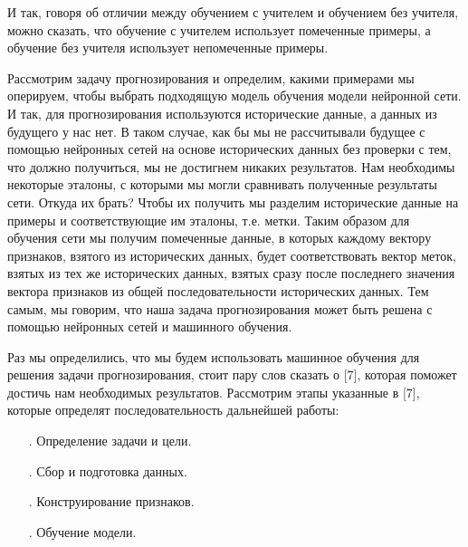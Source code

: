 {	\par \redline И так, говоря об отличии между обучением с учителем и обучением без учителя, можно сказать, что обучение с учителем использует помеченные примеры, а обучение без учителя использует непомеченные примеры. 
	
	\par \redline	Рассмотрим задачу прогнозирования и определим, какими примерами мы оперируем, чтобы выбрать подходящую модель обучения модели нейронной сети. И так, для прогнозирования используются исторические данные, а данных из будущего у нас нет. В таком случае, как бы мы не рассчитывали будущее с помощью нейронных сетей на основе исторических данных без проверки с тем, что должно получиться, мы не достигнем никаких результатов. Нам необходимы некоторые эталоны, с которыми мы могли сравнивать полученные результаты сети. Откуда их брать? Чтобы их получить мы разделим исторические данные на примеры и соответствующие им эталоны, т.е. метки. Таким образом для обучения сети мы получим помеченные данные, в которых каждому вектору признаков, взятого из исторических данных, будет соответствовать вектор меток, взятых из тех же исторических данных, взятых сразу после последнего значения вектора признаков из общей последовательности исторических данных. Тем самым, мы говорим, что наша задача прогнозирования может быть решена с помощью нейронных сетей и машинного обучения.
	
	\par \redline Раз мы определились, что мы будем использовать машинное обучения для решения задачи прогнозирования, стоит пару слов сказать о [7], которая поможет достичь нам необходимых результатов. Рассмотрим этапы указанные в [7], которые определят последовательность дальнейшей работы:
	
	
	\begin{itemize}[leftmargin=2.15cm, labelwidth=0.65cm, labelsep=0.0cm] 
		
		\item[\theitemcntr. ] Определение задачи и цели.
		\addtocounter{itemcntr}{1}
		
		\item[\theitemcntr. ] Сбор и подготовка данных.
		\addtocounter{itemcntr}{1}
		
		\item[\theitemcntr. ] Конструирование признаков.
		\addtocounter{itemcntr}{1}
		
		\item[\theitemcntr. ] Обучение модели.
		\addtocounter{itemcntr}{1}
		

\end{itemize}}
